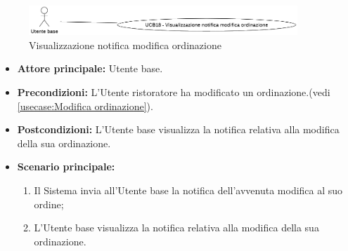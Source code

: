 \label{usecase:Visualizzazione notifica modifica ordinazione}

\begin{figure}[h]
	\centering
	\includegraphics[width=0.9\textwidth]{./uml/UCB18.png} 
	\caption{Visualizzazione notifica modifica ordinazione}
	\label{fig:UCB18}
  \end{figure}

\begin{itemize}
	\item \textbf{Attore principale:} Utente base.

	\item \textbf{Precondizioni:} L'Utente ristoratore ha modificato un ordinazione.(vedi \autoref{usecase:Modifica ordinazione}).

	\item \textbf{Postcondizioni:} L'Utente base visualizza la notifica relativa alla modifica della sua ordinazione.

	\item \textbf{Scenario principale:}
	      \begin{enumerate}
		      \item Il Sistema invia all'Utente base la notifica dell'avvenuta modifica al suo ordine;

		      \item L'Utente base visualizza la notifica relativa alla modifica della sua ordinazione.
	      \end{enumerate}
\end{itemize}
